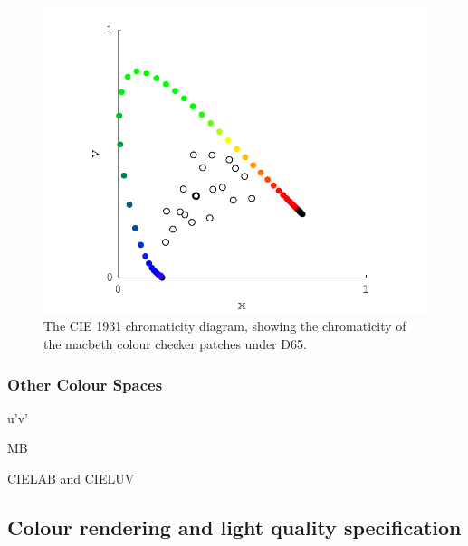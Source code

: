 \begin{figure}[htbp]
\includegraphics[max width=\textwidth]{figs/LitRev/ColorimetryDemo1.pdf}
\caption{The CIE 1931 chromaticity diagram, showing the chromaticity of the macbeth colour checker patches under D65.}
\label{fig:1931}
\end{figure}

\subsubsection{Other Colour Spaces}

u'v' 

\gls{MB}

CIELAB and CIELUV

\subsection{Colour rendering and light quality specification}


